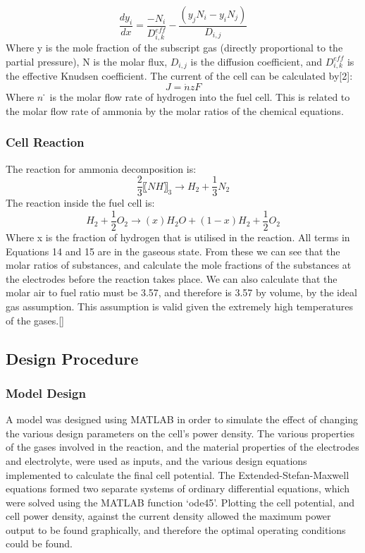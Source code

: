 \begin{equation}
\frac{dy_{i}}{dx}=  \frac{-N_i}{D_{i,k}^{eff}}  - \frac{(y_j N_i- y_i N_j)}{D_{i,j}}					
\end{equation}
Where y is the mole fraction of the subscript gas (directly proportional to the partial pressure), N is the molar flux, $D_{i,j}$ is the diffusion coefficient, and $D_{i,k}^{eff}$ is the effective Knudsen coefficient. 
The current of the cell can be calculated by[2]:
\begin{equation}
J= \dot n zF					
\end{equation}
Where $n$ ̇ is the molar flow rate of hydrogen into the fuel cell. This is related to the molar flow rate of ammonia by the molar ratios of the chemical equations.

    \subsubsection{Cell Reaction}
    The reaction for ammonia decomposition is:
    \begin{equation}
\frac{2}{3} 〖NH〗_3  →  H_2+  \frac{1}{3} N_2					
\end{equation}
The reaction inside the fuel cell is:
\begin{equation}
H_2+  \frac{1}{2} O_2  → (x)H_2 O+(1-x)H_2+  \frac{1}{2} O_2
\end{equation}
Where x is the fraction of hydrogen that is utilised in the reaction. All terms in Equations 14 and 15 are in the gaseous state. From these we can see that the molar ratios of substances, and calculate the mole fractions of the substances at the electrodes before the reaction takes place. We can also calculate that the molar air to fuel ratio must be 3.57, and therefore is 3.57 by volume, by the ideal gas assumption. This assumption is valid given the extremely high temperatures of the gases.[]

\subsection{Design Procedure}
    \subsubsection{Model Design}
    A model was designed using MATLAB in order to simulate the effect of changing the various design parameters on the cell’s power density. The various properties of the gases involved in the reaction, and the material properties of the electrodes and electrolyte, were used as inputs, and the various design equations implemented to calculate the final cell potential. The Extended-Stefan-Maxwell equations formed two separate systems of ordinary differential equations, which were solved using the MATLAB function ‘ode45’. Plotting the cell potential, and cell power density, against the current density allowed the maximum power output to be found graphically, and therefore the optimal operating conditions could be found.
